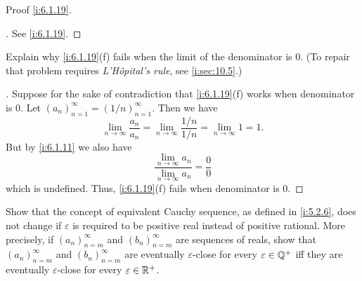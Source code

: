 \begin{ex}\label{i:ex:6.1.8}
  Proof \cref{i:6.1.19}.
\end{ex}

\begin{proof}[]
  See \cref{i:6.1.19}.
\end{proof}

\begin{ex}\label{i:ex:6.1.9}
  Explain why \cref{i:6.1.19}(f) fails when the limit of the denominator is \(0\).
  (To repair that problem requires \emph{L'Hôpital's rule}, see \cref{i:sec:10.5}.)
\end{ex}

\begin{proof}[]
  Suppose for the sake of contradiction that \cref{i:6.1.19}(f) works when denominator is \(0\).
  Let \((a_n)_{n = 1}^\infty = (1 / n)_{n = 1}^\infty\).
  Then we have
  \[
    \lim_{n \to \infty} \dfrac{a_n}{a_n} = \lim_{n \to \infty} \dfrac{1 / n}{1 / n} = \lim_{n \to \infty} 1 = 1.
  \]
  But by \cref{i:6.1.11} we also have
  \[
    \dfrac{\lim_{n \to \infty} a_n}{\lim_{n \to \infty} a_n} = \dfrac{0}{0}
  \]
  which is undefined.
  Thus, \cref{i:6.1.19}(f) fails when denominator is \(0\).
\end{proof}

\begin{ex}\label{i:ex:6.1.10}
  Show that the concept of equivalent Cauchy sequence, as defined in \cref{i:5.2.6}, does not change if \(\varepsilon\) is required to be positive real instead of positive rational.
  More precisely, if \((a_n)_{n = m}^\infty\) and \((b_n)_{n = m}^\infty\) are sequences of reals, show that \((a_n)_{n = m}^\infty\) and \((b_n)_{n = m}^\infty\) are eventually \(\varepsilon\)-close for every \(\varepsilon \in \mathbb{Q}^+\) iff they are eventually \(\varepsilon\)-close for every \(\varepsilon \in \mathbb{R}^+\).
\end{ex}

